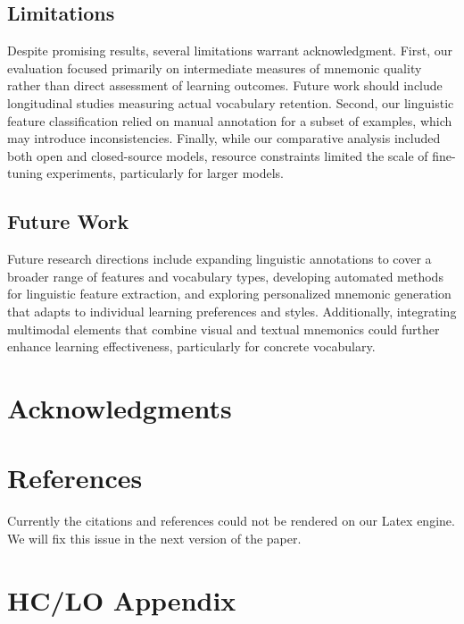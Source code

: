 \documentclass{article}
\newcounter{para}
\begin{document}
\subsection{Limitations}
Despite promising results, several limitations warrant acknowledgment. First, our evaluation focused primarily on intermediate measures of mnemonic quality rather than direct assessment of learning outcomes. Future work should include longitudinal studies measuring actual vocabulary retention. Second, our linguistic feature classification relied on manual annotation for a subset of examples, which may introduce inconsistencies. Finally, while our comparative analysis included both open and closed-source models, resource constraints limited the scale of fine-tuning experiments, particularly for larger models.

\subsection{Future Work}
Future research directions include expanding linguistic annotations to cover a broader range of features and vocabulary types, developing automated methods for linguistic feature extraction, and exploring personalized mnemonic generation that adapts to individual learning preferences and styles. Additionally, integrating multimodal elements that combine visual and textual mnemonics could further enhance learning effectiveness, particularly for concrete vocabulary.

\section*{Acknowledgments}
\section*{References}
%
%
Currently the citations and references could not be rendered on our Latex engine. We will fix this issue in the next version of the paper.

\clearpage

\appendix


\section{HC/LO Appendix}
\label{sec:hclo}
\end{document}
